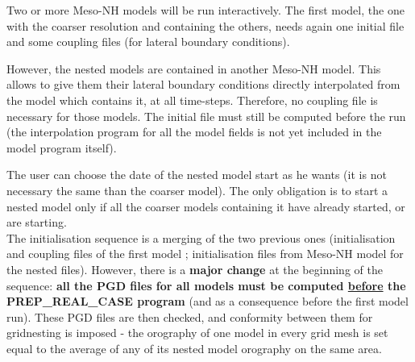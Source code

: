 Two or more Meso-NH models will be run interactively. The first model, the
one with the coarser resolution and containing the others, needs again
one initial file and some coupling files (for lateral boundary conditions).

However, the nested models are contained in another Meso-NH model. This
allows to give them their lateral boundary conditions directly interpolated
from the model which contains it, at all time-steps. Therefore, no coupling file
is necessary for those models. The initial file must still be computed
before the run (the interpolation program for all the model fields is not yet
included in the model program itself).

The user can choose the date of the nested model start as he wants
(it is not necessary the same than the coarser model). The only obligation
is to start a nested model only if all the coarser models containing it
have already started, or are starting.\\

The initialisation sequence is a merging of the two previous ones
(initialisation and coupling files of the first model ; initialisation
files from Meso-NH model for the nested files).  However, there is a {\bf
major change} at the beginning of the sequence: {\bf all the PGD files for
all models must be computed \underline{before} the PREP\_REAL\_CASE
program} (and as a consequence before the first model run). These PGD files
are then checked, and conformity between them for gridnesting is imposed
- the orography of one model in every grid mesh is set equal to
the average of any of its nested model orography on the same area.

